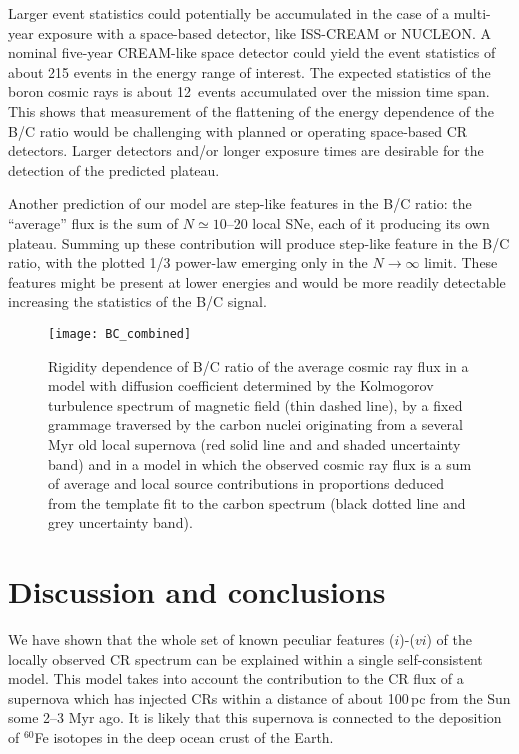 \documentclass[prd,aps,twocolumn]{revtex4}
\begin{document}
Larger event statistics could potentially be accumulated in the case of a 
multi-year exposure with a space-based detector, like ISS-CREAM or NUCLEON.  
A nominal five-year CREAM-like space detector could yield the event statistics
  of about 215 events in the energy range of interest.  The expected 
statistics of the boron cosmic rays is about 12~events accumulated over the 
mission time span. This shows that measurement of the flattening of the 
energy dependence of the B/C ratio would be challenging with  planned or 
operating space-based CR detectors. Larger detectors and/or longer 
exposure times are desirable for the detection of the predicted plateau. 

Another prediction of
our model are step-like features in the  B/C ratio: the
``average'' flux is the sum of $N\simeq 10$--20 local SNe, each of it 
producing its own plateau. Summing up these contribution will produce
step-like feature in the B/C ratio, with the plotted 1/3 power-law
emerging only in the $N\to\infty$ limit. These features might be present 
at lower energies and would be more readily detectable increasing 
the statistics of the B/C signal. 


\begin{figure}
\texttt{[image: BC\_combined]}
\caption{Rigidity dependence of B/C ratio of the average cosmic ray flux  in a model with diffusion coefficient determined by the Kolmogorov turbulence spectrum of magnetic field (thin dashed line), by a fixed grammage traversed by the carbon nuclei originating from a several Myr old local supernova (red solid line and and shaded uncertainty band) and in a model in which the observed cosmic ray flux is a sum of average and local source contributions in proportions deduced from the template fit to the carbon spectrum (black dotted line and grey uncertainty band).   }
\label{fig:bc}
\end{figure}

\section{Discussion and conclusions}

We have shown that the whole set of known peculiar features ($i$)-($vi$) 
of the locally observed CR spectrum can be explained within a single 
self-consistent model. This model takes into account the contribution to the 
CR flux of a supernova which has injected CRs within a distance of about 
100\,pc from the Sun some 2--3 Myr ago. It is likely that this supernova is
connected to the deposition of $^{60}$Fe isotopes in the deep ocean crust 
of the Earth.
\end{document}
